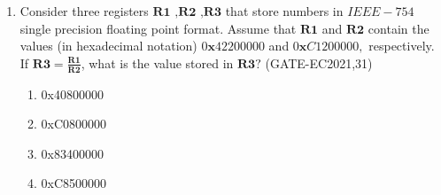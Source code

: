 \documentclass[a4paper ,10pt]{article}
\begin{document}
\begin{enumerate}
\item Consider three registers $\textbf{R1 ,R2 ,R3}$ that store numbers in $ IEEE-754 $ single precision floating point format. Assume that $\textbf{R1}$ and $\textbf{R2}$ contain the values (in hexadecimal notation) $0\textbf{x}42200000$ and $0\textbf{x}C1200000,$ respectively. If $ \textbf{R3}=\frac{\textbf{R1}}{\textbf{R2}} $, what is the value stored in $\textbf{R3}?$
\hfill(GATE-EC2021,31)
\begin{enumerate}
    \item 0x40800000
    \item 0xC0800000
    \item 0x83400000
    \item 0xC8500000
\end{enumerate}


\end{enumerate}
\end{document}
